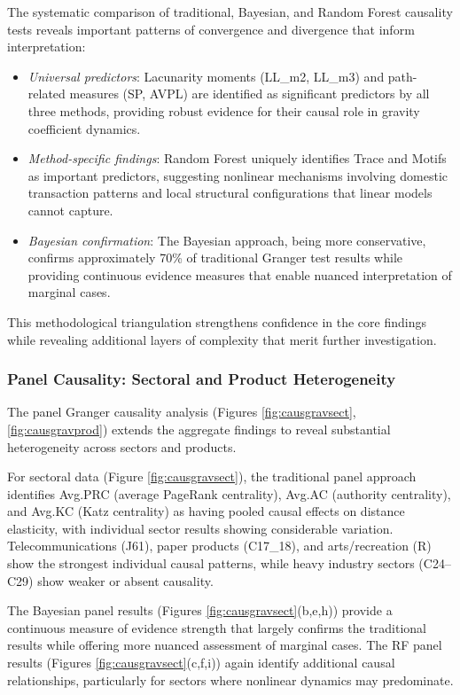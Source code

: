 \documentclass[preprint, 3p,
authoryear]{elsarticle} %
\begin{document}
The systematic comparison of traditional, Bayesian, and Random Forest
causality tests reveals important patterns of convergence and divergence
that inform interpretation:

\begin{itemize}
    \item \textit{Universal predictors}: Lacunarity moments (LL\_m2, LL\_m3) and path-related measures (SP, AVPL) are identified as significant predictors by all three methods, providing robust evidence for their causal role in gravity coefficient dynamics.
    \item \textit{Method-specific findings}: Random Forest uniquely identifies Trace and Motifs as important predictors, suggesting nonlinear mechanisms involving domestic transaction patterns and local structural configurations that linear models cannot capture.
    \item \textit{Bayesian confirmation}: The Bayesian approach, being more conservative, confirms approximately 70\% of traditional Granger test results while providing continuous evidence measures that enable nuanced interpretation of marginal cases.
\end{itemize}

This methodological triangulation strengthens confidence in the core
findings while revealing additional layers of complexity that merit
further investigation.

\subsubsection{Panel Causality: Sectoral and Product
Heterogeneity}\label{panel-causality-sectoral-and-product-heterogeneity}

The panel Granger causality analysis (Figures \ref{fig:causgravsect},
\ref{fig:causgravprod}) extends the aggregate findings to reveal
substantial heterogeneity across sectors and products.

For sectoral data (Figure \ref{fig:causgravsect}), the traditional panel
approach identifies Avg.PRC (average PageRank centrality), Avg.AC
(authority centrality), and Avg.KC (Katz centrality) as having pooled
causal effects on distance elasticity, with individual sector results
showing considerable variation. Telecommunications (J61), paper products
(C17\_18), and arts/recreation (R) show the strongest individual causal
patterns, while heavy industry sectors (C24--C29) show weaker or absent
causality.

The Bayesian panel results (Figures \ref{fig:causgravsect}(b,e,h))
provide a continuous measure of evidence strength that largely confirms
the traditional results while offering more nuanced assessment of
marginal cases. The RF panel results (Figures
\ref{fig:causgravsect}(c,f,i)) again identify additional causal
relationships, particularly for sectors where nonlinear dynamics may
predominate.
\end{document}
